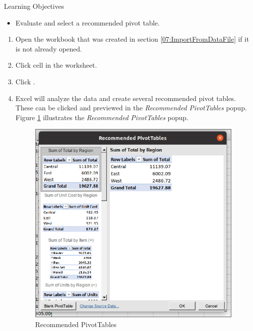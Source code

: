 \begin{center}
	\begin{objbox}{Learning Objectives}
		\begin{itemize}
			\setlength{\itemsep}{0pt}
			\setlength{\parskip}{0pt}
			\setlength{\parsep}{0pt}
			
			\item Evaluate and select a recommended pivot table.
			
		\end{itemize}
	\end{objbox}
\end{center}

\begin{enumbox}
	\begin{enumerate}
		\item Open the  workbook that was created in section \ref{07:ImportFromDataFile} if it is not already opened.
		\item Click cell  in the  worksheet.
		\item Click .
		\item Excel will analyze the data and create several recommended pivot tables. These can be clicked and previewed in the \textit{Recommended PivotTables} popup. Figure \ref{07:fig26} illustrates the \textit{Recommended PivotTables} popup.

		\begin{figure}[H]
			\centering
			\includegraphics[width=\maxwidth{.95\linewidth}]{gfx/ch07_fig26}
			\caption{Recommended PivotTables}
			\label{07:fig26}
		\end{figure}


\end{enumerate}
\end{enumbox}
